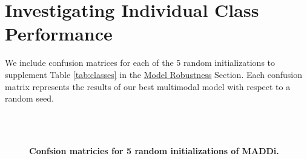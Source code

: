 \begin{table}[H]
\caption{\textbf{F1-Score Distribution for different attention-based and attention-free baselines.} The table shows the F1-score distribution across 100 random seeds to show the value of attention in a deep learning model. The table demonstrates that the combination of self-attention with cross-modal attention performs the best with the most narrow variation.} \label{tab:attention}
\end{table}

\newpage
\section{Investigating Individual Class Performance}
\label{confusion}
We include confusion matrices for each of the 5 random initializations to supplement Table \ref{tab:classes} in the \hyperref[subsection:robust]{Model Robustness} Section. Each confusion matrix represents the results of our best multimodal model with respect to a random seed. 

\begin{figure}[H]

    \\
     \\
    \caption{\textbf{Confsion matricies for 5 random initializations of MADDi.}}
    \label{fig:confusion}

\end{figure}




